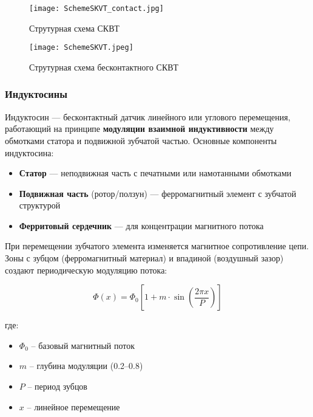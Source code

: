   \begin{figure}[htbp]
    \centering
    \begin{minipage}{0.48\linewidth}%
         \centering
          \texttt{[image: SchemeSKVT\_contact.jpg]}
          \caption{Струтурная схема СКВТ}
          \label{SchemeSKVT_Contact}
    \end{minipage}\hfill%
    \begin{minipage}{0.48\linewidth}%
        \centering
        \texttt{[image: SchemeSKVT.jpeg]}
        \caption{Струтурная схема бесконтактного СКВТ}
        \label{SchemeSKVT}
    \end{minipage}
\end{figure}

\subsubsection{Индуктосины}

Индуктосин — бесконтактный датчик линейного или углового перемещения, работающий на принципе \textbf{модуляции взаимной индуктивности} между обмотками статора 
и подвижной зубчатой частью. 
Основные компоненты индуктосина:
\begin{itemize}
    \item \textbf{Статор} — неподвижная часть с печатными или намотанными обмотками
    \item \textbf{Подвижная часть} (ротор/ползун) — ферромагнитный элемент с зубчатой структурой
    \item \textbf{Ферритовый сердечник} — для концентрации магнитного потока
\end{itemize}


При перемещении зубчатого элемента изменяется магнитное сопротивление цепи. Зоны с зубцом (ферромагнитный материал) и впадиной (воздушный зазор) создают 
периодическую модуляцию потока:

\begin{equation}
    \Phi(x) = \Phi_0 \left[ 1 + m \cdot \sin\left(\frac{2\pi x}{P}\right) \right]
\end{equation}

где:
\begin{itemize}
    \item $\Phi_0$ -- базовый магнитный поток
    \item $m$ -- глубина модуляции (0.2–0.8)
    \item $P$ -- период зубцов
    \item $x$ -- линейное перемещение
\end{itemize}

